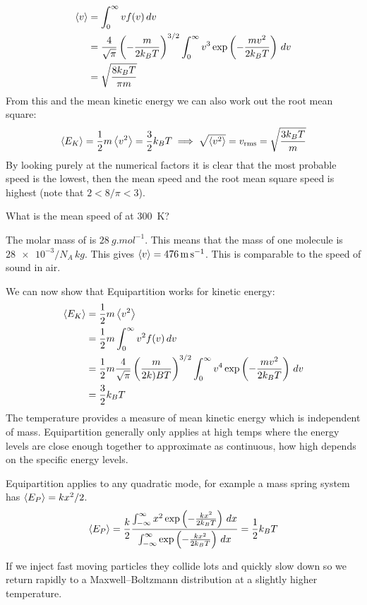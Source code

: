\documentclass{article}
\begin{document}
    \begin{align*}
        \left\langle{v}\right\rangle &= \int_0^\infty vf(v)\, dv\\
        &= \frac{4}{\sqrt{\pi}}\left(-\frac{m}{2k_BT}\right)^{3/2} \int_0^\infty v^3\exp\left(-\frac{mv^2}{2k_BT}\right)\,dv\\
        &= \sqrt{\frac{8k_BT}{\pi m}}
    \end{align*}
    From this and the mean kinetic energy we can also work out the root mean square:
    \[\left\langle{E_K}\right\rangle = \frac{1}{2}m\left\langle{v^2}\right\rangle = \frac{3}{2}k_BT \implies \sqrt{\left\langle{v^2}\right\rangle} = v_\mathrm{rms} = \sqrt{\frac{3k_BT}{m}}\]
    By looking purely at the numerical factors it is clear that the most probable speed is the lowest, then the mean speed and the root mean square speed is highest (note that \(2 < 8/\pi < 3\)).
    
    \example
    What is the mean speed of  at \SI{300}{K}?
    
    The molar mass of  is \(\SI{28}{g.mol^{-1}}\).
    This means that the mass of one molecule is \(\num{28e-3}/N_A\,\si{kg}\).
    This gives \(\left\langle{v}\right\rangle = \SI{476}{m.s^{-1}}\).
    This is comparable to the speed of sound in air.
    
    We can now show that Equipartition works for kinetic energy:
    \begin{align*}
        \left\langle{E_K}\right\rangle &= \frac{1}{2}m\left\langle{v^2}\right\rangle\\
        &= \frac{1}{2}m\int_0^\infty v^2 f(v)\,dv\\
        &= \frac{1}{2}m\frac{4}{\sqrt{\pi}}\left(\frac{m}{2k)BT}\right)^{3/2} \int_0^{\infty}v^4 \exp\left(-\frac{mv^2}{2k_BT}\right) \,dv\\
        &= \frac{3}{2}k_BT
    \end{align*}
    The temperature provides a measure of mean kinetic energy which is independent of mass.
    Equipartition generally only applies at high temps where the energy levels are close enough together to approximate as continuous, how high depends on the specific energy levels.
    
    Equipartition applies to any quadratic mode, for example a mass spring system has \(\left\langle{E_P}\right\rangle = kx^2/2\).
    \[\left\langle{E_P}\right\rangle = \frac{k}{2} \frac{\int_{-\infty}^\infty x^2 \exp\left(-\frac{kx^2}{2k_BT}\right)\,dx}{\int_{-\infty}^{\infty} \exp\left(-\frac{kx^2}{2k_BT}\right)\,dx} = \frac{1}{2}k_BT\]
    
    If we inject fast moving particles they collide lots and quickly slow down so we return rapidly to a Maxwell--Boltzmann distribution at a slightly higher temperature.
    
\end{document}
